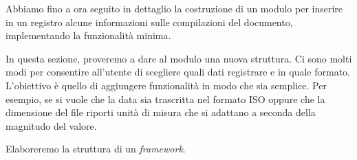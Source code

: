 Abbiamo fino a ora seguito in dettaglio la costruzione di un modulo per inserire
in un registro alcune informazioni sulle compilazioni del documento,
implementando la funzionalità minima.

In questa sezione, proveremo a dare al modulo una nuova struttura. Ci sono molti
modi per consentire all'utente di scegliere quali dati registrare e in quale
formato. L'obiettivo è quello di aggiungere funzionalità in modo che sia
semplice. Per esempio, se si vuole che la data sia trascritta nel formato ISO
 oppure che la dimensione del file riporti unità di misura
che si adattano a seconda della magnitudo del valore.

Elaboreremo la struttura di un \emph{framework}.







